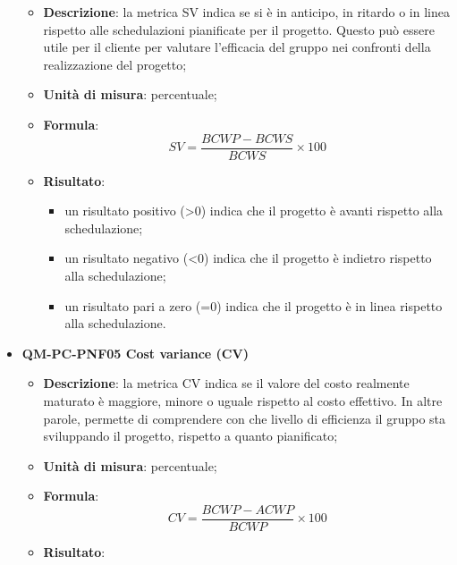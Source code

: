 \begin{itemize}
\begin{itemize}
                            \item\textbf{Descrizione}: la metrica SV indica se si è in anticipo, in ritardo o in linea rispetto alle schedulazioni pianificate per il progetto. Questo può essere utile per il cliente per valutare l'efficacia del gruppo nei confronti della realizzazione del progetto;
                            \item\textbf{Unità di misura}: percentuale;
                            \item\textbf{Formula}: \\
                                \[SV = \frac{\mathit{BCWP} - \mathit{BCWS}}{\mathit{BCWS}} \times 100\]
                            \item\textbf{Risultato}:
                                \begin{itemize}
                                    \item un risultato positivo (>0) indica che il progetto è avanti rispetto alla schedulazione;
                                    \item un risultato negativo (<0) indica che il progetto è indietro rispetto alla schedulazione;
                                    \item un risultato pari a zero (=0) indica che il progetto è in linea rispetto alla schedulazione.
                                \end{itemize}
                        \end{itemize}
                    \item\textbf{QM-PC-PNF05 Cost variance (CV)}
                        \begin{itemize}
                            \item\textbf{Descrizione}: la metrica CV indica se il valore del costo realmente maturato è maggiore, minore o uguale rispetto al costo effettivo. In altre parole, permette di comprendere con che livello di efficienza il gruppo sta sviluppando il progetto, rispetto a quanto pianificato;
                            \item\textbf{Unità di misura}: percentuale;
                            \item\textbf{Formula}: \\
                                \[CV = \frac{\mathit{BCWP} - \mathit{ACWP}}{\mathit{BCWP}} \times 100\]
                            \item\textbf{Risultato}:
                                \begin{itemize}

\end{itemize}
\end{itemize}
\end{itemize}
